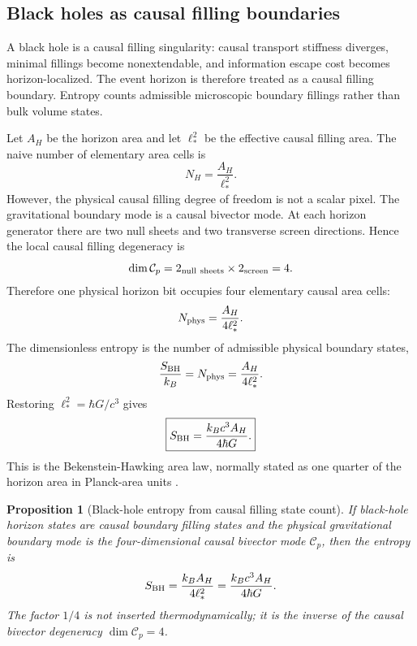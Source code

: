 \documentclass[11pt]{article}
\newtheorem{proposition}[definition]{Proposition}
\newcommand{\C}{\mathcal C}
\begin{document}
\subsection{Black holes as causal filling boundaries}

A black hole is a causal filling singularity: causal transport stiffness diverges, minimal fillings become nonextendable, and information escape cost becomes horizon-localized. The event horizon is therefore treated as a causal filling boundary. Entropy counts admissible microscopic boundary fillings rather than bulk volume states.

Let $A_H$ be the horizon area and let $\ell_*^2$ be the effective causal filling area. The naive number of elementary area cells is
\begin{equation}
N_H=\frac{A_H}{\ell_*^2}.
\end{equation}
However, the physical causal filling degree of freedom is not a scalar pixel. The gravitational boundary mode is a causal bivector mode. At each horizon generator there are two null sheets and two transverse screen directions. Hence the local causal filling degeneracy is
\begin{equation}
\dim \C_p=2_{\rm null\ sheets}\times2_{\rm screen}=4.
\end{equation}
Therefore one physical horizon bit occupies four elementary causal area cells:
\begin{equation}
N_{\rm phys}=\frac{A_H}{4\ell_*^2}.
\end{equation}
The dimensionless entropy is the number of admissible physical boundary states,
\begin{equation}
\frac{S_{\rm BH}}{k_B}=N_{\rm phys}=\frac{A_H}{4\ell_*^2}.
\end{equation}
Restoring $\ell_*^2=\hbar G/c^3$ gives
\begin{equation}
\boxed{S_{\rm BH}=\frac{k_Bc^3A_H}{4\hbar G}.}
\end{equation}
This is the Bekenstein-Hawking area law, normally stated as one quarter of the horizon area in Planck-area units \cite{bekensteinhawking-scholarpedia}.

\begin{proposition}[Black-hole entropy from causal filling state count]
If black-hole horizon states are causal boundary filling states and the physical gravitational boundary mode is the four-dimensional causal bivector mode $\C_p$, then the entropy is
\begin{equation}
S_{\rm BH}=\frac{k_BA_H}{4\ell_*^2}=\frac{k_Bc^3A_H}{4\hbar G}.
\end{equation}
The factor $1/4$ is not inserted thermodynamically; it is the inverse of the causal bivector degeneracy $\dim\C_p=4$.
\end{proposition}
\end{document}
